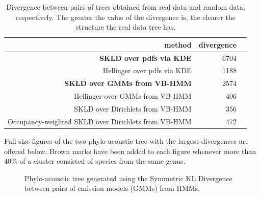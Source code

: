 \documentclass[pdftex,11pt,a4paper]{article}
\theoremstyle{definition}
\theoremstyle{remark}
\begin{document}
\begin{table}[t]
\begin{tabular}{r|r|r}
     \textbf{method} &\textbf{divergence}\\
     \hline
     \textbf{SKLD over pdfs via KDE} & 6704\\
     Hellinger over pdfs via KDE & 1188\\
     \textbf{SKLD over GMMs from VB-HMM} & 2574\\
     Hellinger over GMMs from VB-HMM & 406\\
     SKLD over Dirichlets from VB-HMM & 356\\
     Occupancy-weighted SKLD over Dirichlets from VB-HMM & 472
\end{tabular} 
\caption{Divergence between pairs of trees obtained from real data and random data, respectively. The greater the value of the divergence is, the clearer the structure the real data tree has.} \label{tab1}
\end{table}

\par Full-size figures of the two phylo-acoustic tree with the largest divergences are offered below. Brown marks have been added to each figure whenever more than 40\% of a cluster consisted of species from the same genus.

\begin{figure}
\noindent{}
    \caption{Phylo-acoustic tree generated using the Symmetric KL Divergence between pairs of emission models (GMMs) from HMMs.}
    \label{fig:gmmskld}
\end{figure}
\end{document}
